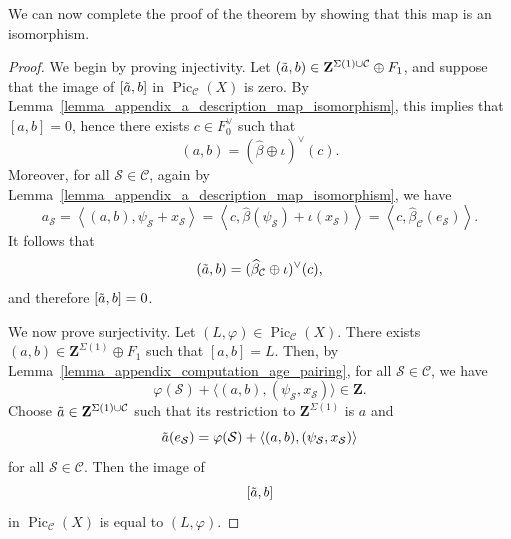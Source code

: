 \documentclass{proc-l}
\newcommand{\Z}{\mathbf{Z}}
\DeclareMathOperator{\Pic}{Pic}
\newcommand{\stackS}{\mathcal{S}}
\theoremstyle{definition}
\theoremstyle{remark}
\numberwithin{equation}{section}
\begin{document}
We can now complete the proof of the theorem by showing that this map is an isomorphism.
\begin{proof}
We begin by proving injectivity. Let $(\Tilde{a},b) \in \Z^{\Sigma(1) \cup \mathcal{C}} \oplus F_1$, and suppose that the image of $[\Tilde{a},b]$ in $\Pic_{\mathcal{C}}(X)$ is zero. By Lemma~\ref{lemma_appendix_a_description_map_isomorphism}, this implies that $[a,b] = 0$, hence there exists $c \in F_0^{\vee}$ such that
\[
(a,b) = (\widehat{\beta} \oplus \iota)^{\vee}(c).
\]
Moreover, for all $\stackS \in \mathcal{C}$, again by Lemma~\ref{lemma_appendix_a_description_map_isomorphism}, we have
\[
a_{\stackS} = \left\langle (a,b) , \psi_{\stackS} + x_{\stackS} \right\rangle 
= \left\langle c , \widehat{\beta}(\psi_{\stackS}) + \iota(x_{\stackS}) \right\rangle 
= \left\langle c , \widehat{\beta}_{\mathcal{C}}(e_{\stackS}) \right\rangle.
\]
It follows that
\[
(\Tilde{a},b) = (\widehat{\beta}_{\mathcal{C}} \oplus \iota)^{\vee}(c),
\]
and therefore $[\Tilde{a},b] = 0$.

We now prove surjectivity. Let $(L,\varphi) \in \Pic_{\mathcal{C}}(X)$. There exists $(a,b) \in \Z^{\Sigma(1)} \oplus F_1$ such that $[a,b] = L$. Then, by Lemma~\ref{lemma_appendix_computation_age_pairing}, for all $\stackS \in \mathcal{C}$, we have
\[
\varphi(\stackS) + \langle (a,b) , (\psi_{\stackS},x_{\stackS}) \rangle \in \Z.
\]
Choose $\Tilde{a} \in \Z^{\Sigma(1)\cup \mathcal{C}}$ such that its restriction to $\Z^{\Sigma(1)}$ is $a$ and
\[
\Tilde{a}(e_{\stackS}) = \varphi(\stackS) + \langle (a,b) , (\psi_{\stackS},x_{\stackS}) \rangle
\]
for all $\stackS \in \mathcal{C}$. Then the image of
\[
[\Tilde{a},b]
\]
in $\Pic_{\mathcal{C}}(X)$ is equal to $(L,\varphi)$.
\end{proof}









\end{document}
